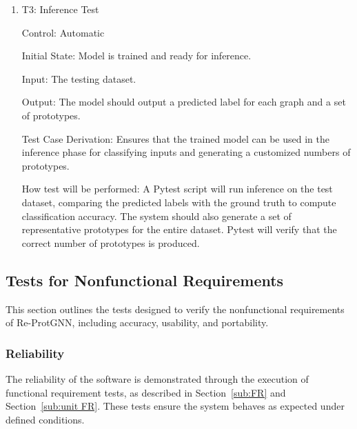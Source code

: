 \documentclass[12pt, titlepage]{article}
\begin{document}
\begin{enumerate}
					
\item{T3: Inference Test\\}

Control: Automatic
					
Initial State: Model is trained and ready for inference.
					
Input: The testing dataset.
					
Output: The model should output a predicted label for each graph and a set of prototypes.

Test Case Derivation: Ensures that the trained model can be used in the inference phase for classifying inputs and generating a customized numbers of prototypes.

How test will be performed: A Pytest script will run inference on the test dataset, comparing the predicted labels with the ground truth to compute classification accuracy. The system should also generate a set of representative prototypes for the entire dataset. Pytest will verify that the correct number of prototypes is produced.

\end{enumerate}


\subsection{Tests for Nonfunctional Requirements}

This section outlines the tests designed to verify the nonfunctional requirements of Re-ProtGNN, including accuracy, usability, and portability.

\subsubsection{Reliability}
		
The reliability of the software is demonstrated through the execution of functional requirement tests, as described in Section~\ref{sub:FR} and Section~\ref{sub:unit FR}. These tests ensure the system behaves as expected under defined conditions.




					
					
\end{document}
